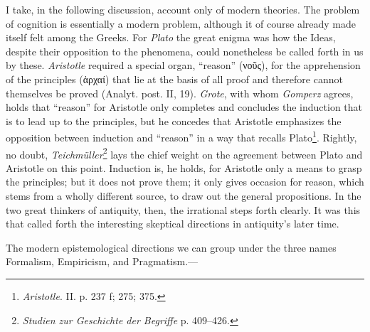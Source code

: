 \documentclass[12pt,a4paper]{book}
\newcommand{\opage}[1]{\marginnote{\footnotesize\textit{[#1]}}}
\begin{document}
I take, in the following discussion, account only of modern theories. The
problem of cognition is essentially a modern problem, although it of course
already made itself felt among the Greeks. For \emph{Plato} the great enigma
was how the Ideas, despite their opposition to the phenomena, could nonetheless
be called forth in us by these. \emph{Aristotle} required a special organ,
``reason'' (νοῦς), for the apprehension of the principles (ἀρχαί) that lie at
the basis of all proof and therefore cannot themselves be proved (Analyt. post.
II, 19). \emph{Grote}, with whom \emph{Gomperz} agrees, holds that ``reason''
for Aristotle only completes and concludes the induction that \opage{266}is to lead up to
the principles, but he concedes that Aristotle emphasizes the opposition
between induction and ``reason'' in a way that recalls Plato\footnote{\emph{Aristotle}.
II. p. 237 f; 275; 375.}. Rightly, no doubt, \emph{Teichmüller}\footnote{\emph{Studien
zur Geschichte der Begriffe} p. 409--426.} lays the chief weight on the
agreement between Plato and Aristotle on this point. Induction is, he holds,
for Aristotle only a means to grasp the principles; but it does not prove them;
it only gives occasion for reason, which stems from a wholly different source,
to draw out the general propositions. In the two great thinkers of antiquity,
then, the irrational steps forth clearly. It was this that called forth the
interesting skeptical directions in antiquity's later time.

The modern epistemological directions we can group under the three names
Formalism, Empiricism, and Pragmatism.---
\end{document}
